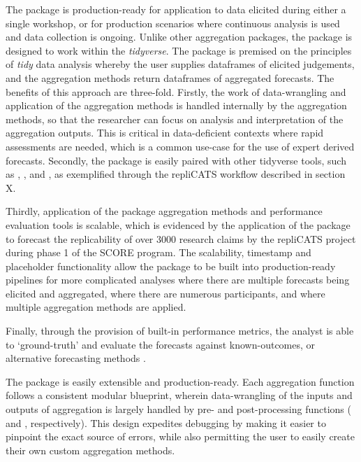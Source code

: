 \documentclass[article]{jss}
\newcommand{\fct}[1]{\code{#1()}}
\begin{document}
The  package is production-ready for application to data
elicited during either a single workshop, or for production scenarios
where continuous analysis is used and data collection is ongoing. Unlike
other aggregation packages, the  package is designed to
work within the \emph{tidyverse}. The package is premised on the
principles of \emph{tidy} data analysis whereby the user supplies
dataframes of elicited judgements, and the aggregation methods return
dataframes of aggregated forecasts. The benefits of this approach are
three-fold. Firstly, the work of data-wrangling and application of the
aggregation methods is handled internally by the aggregation methods, so
that the researcher can focus on analysis and interpretation of the
aggregation outputs. This is critical in data-deficient contexts where
rapid assessments are needed, which is a common use-case for the use of
expert derived forecasts. Secondly, the  package is easily
paired with other tidyverse tools, such as , , and
, as exemplified through the repliCATS workflow described
in section X.

Thirdly, application of the  package aggregation methods
and performance evaluation tools is scalable, which is evidenced by the
application of the  package to forecast the replicability
of over 3000 research claims by the repliCATS project during phase 1 of
the SCORE program. The scalability, timestamp and placeholder
functionality allow the  package to be built into
production-ready pipelines for more complicated analyses where there are
multiple forecasts being elicited and aggregated, where there are
numerous participants, and where multiple aggregation methods are
applied.

Finally, through the provision of built-in performance metrics, the
analyst is able to `ground-truth' and evaluate the forecasts against
known-outcomes, or alternative forecasting methods
\citep[e.g.][]{Arlidge2020}.

The  package is easily extensible and production-ready.
Each aggregation function follows a consistent modular blueprint,
wherein data-wrangling of the inputs and outputs of aggregation is
largely handled by pre- and post-processing functions
(\fct{preprocess\_judgements} and \fct{postprocess\_judgements},
respectively). This design expedites debugging by making it easier to
pinpoint the exact source of errors, while also permitting the user to
easily create their own custom aggregation methods.
\end{document}
